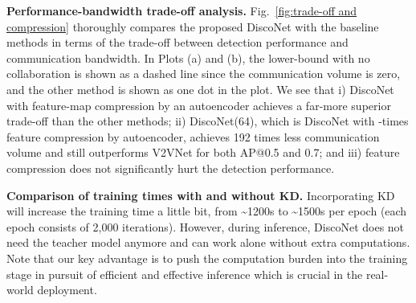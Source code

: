 \documentclass{article}
\newcommand{\mypar}[1]{{\bf #1.}}
\begin{document}
\mypar{Performance-bandwidth trade-off analysis}
Fig.~\ref{fig:trade-off and compression} thoroughly compares the proposed DiscoNet with the baseline methods in terms of the trade-off between detection performance and communication bandwidth. In Plots (a) and (b), the lower-bound with no collaboration is shown as a dashed line since the communication volume is zero, and the other method is shown as one dot in the plot. We see that i) DiscoNet with feature-map compression by an autoencoder achieves a far-more superior trade-off than the other methods; ii) DiscoNet(64), which is DiscoNet with -times feature compression by autoencoder, achieves 192 times less communication volume and still outperforms V2VNet for both AP@0.5 and 0.7; and iii) feature compression does not significantly hurt the detection performance.

\mypar{Comparison of training times with and without KD}
Incorporating KD will increase the training time a little bit, from \textasciitilde1200s to \textasciitilde1500s per epoch (each epoch consists of 2,000 iterations). However, during inference, DiscoNet does not need the teacher model anymore and can work alone without extra computations. Note that our key advantage is to push the computation burden into the training stage in pursuit of efficient and effective inference which is crucial in the real-world deployment.

\begin{table}[t]
\caption{\label{table:fusion-ablation} Comparison of various intermediate collaboration strategies. KD indicates knowledge distillation. With KD and matrix-valued edge weights, our DiscoGraph outperforms the others. }
\scriptsize
  \centering
{}
   \vspace{-4mm}
\end{table}
\end{document}

